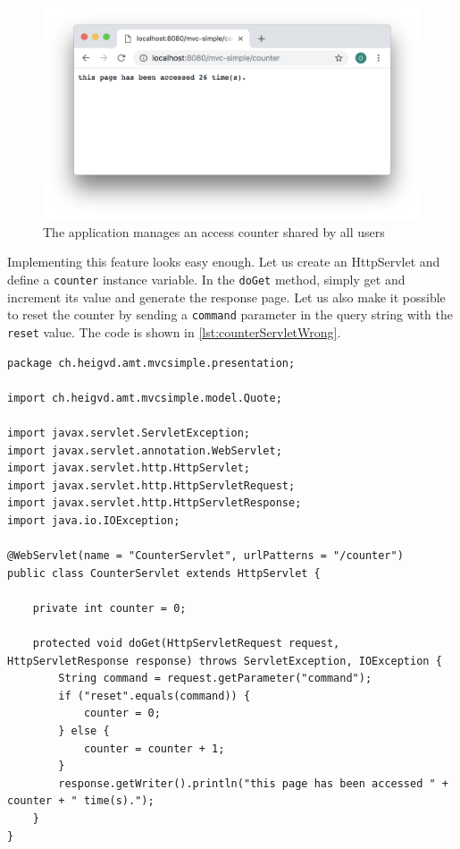 \begin{figure}[]
	\centering
    \includegraphics[width=1.0\linewidth]{Figures/screenshot-servlet-counter.png}
	\caption{The application manages an access counter shared by all users}
  \label{fig:screenshot-servlet-counter}
\end{figure}

Implementing this feature looks easy enough. Let us create an HttpServlet and define a \texttt{counter} instance variable. In the \texttt{doGet} method, simply get and increment its value and generate the response page. Let us also make it possible to reset the counter by sending a \texttt{command} parameter in the query string with the \texttt{reset} value. The code is shown in \ref{lst:counterServletWrong}.

\vspace{10pt}
\begin{minipage}{\linewidth}
\begin{lstlisting}[frame=single]
package ch.heigvd.amt.mvcsimple.presentation;

import ch.heigvd.amt.mvcsimple.model.Quote;

import javax.servlet.ServletException;
import javax.servlet.annotation.WebServlet;
import javax.servlet.http.HttpServlet;
import javax.servlet.http.HttpServletRequest;
import javax.servlet.http.HttpServletResponse;
import java.io.IOException;

@WebServlet(name = "CounterServlet", urlPatterns = "/counter")
public class CounterServlet extends HttpServlet {

    private int counter = 0;

    protected void doGet(HttpServletRequest request, HttpServletResponse response) throws ServletException, IOException {
        String command = request.getParameter("command");
        if ("reset".equals(command)) {
            counter = 0;
        } else {
            counter = counter + 1;
        }
        response.getWriter().println("this page has been accessed " + counter + " time(s).");
    }
}
\end{lstlisting}
\end{minipage}


